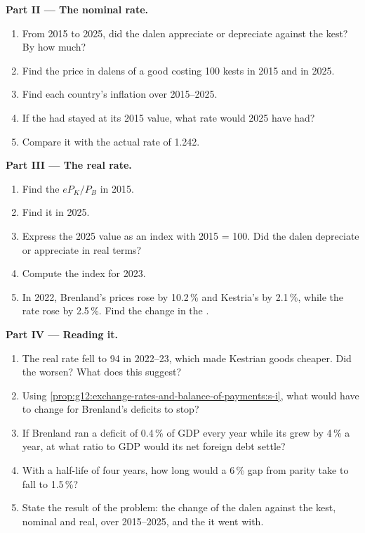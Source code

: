 \begin{problem}
\medskip
\noindent\textbf{Part II --- The nominal rate.}
\begin{enumerate}[resume]
\item From 2015 to 2025, did the dalen appreciate or depreciate against the kest? By how much?
\item Find the price in dalens of a good costing 100 kests in 2015 and in 2025.
\item Find each country's inflation over 2015--2025.
\item If the  had stayed at its 2015 value, what rate would 2025 have had?
\item Compare it with the actual rate of 1.242.
\end{enumerate}

\medskip
\noindent\textbf{Part III --- The real rate.}
\begin{enumerate}[resume]
\item Find the  $e P_K / P_B$ in 2015.
\item Find it in 2025.
\item Express the 2025 value as an index with 2015 = 100. Did the dalen depreciate or appreciate in real terms?
\item Compute the index for 2023.
\item In 2022, Brenland's prices rose by 10.2\,\% and Kestria's by 2.1\,\%, while the rate rose by 2.5\,\%. Find the change in the .
\end{enumerate}

\medskip
\noindent\textbf{Part IV --- Reading it.}
\begin{enumerate}[resume]
\item The real rate fell to 94 in 2022--23, which made Kestrian goods cheaper. Did the  worsen? What does this suggest?
\item Using \cref{prop:g12:exchange-rates-and-balance-of-payments:s-i}, what would have to change for Brenland's deficits to stop?
\item If Brenland ran a deficit of 0.4\,\% of GDP every year while its  grew by 4\,\% a year, at what ratio to GDP would its net foreign debt settle?
\item With a half-life of four years, how long would a 6\,\% gap from parity take to fall to 1.5\,\%?
\item State the result of the problem: the change of the dalen against the kest, nominal and real, over 2015--2025, and the  it went with.
\end{enumerate}
\end{problem}

